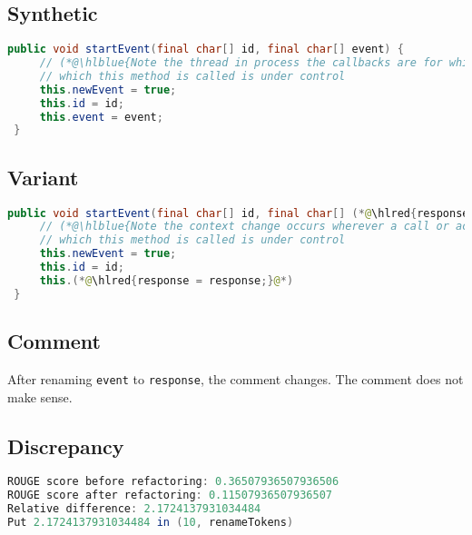 \documentclass[11pt]{article}
\DeclareRobustCommand{\hlred}[1]{{\sethlcolor{YellowOrange}\hl{#1}}}
\DeclareRobustCommand{\hlblue}[1]{{\sethlcolor{SeaGreen}\hl{#1}}}
\DeclareRobustCommand{\hlblue}[1]{{\sethlcolor{SkyBlue}\hl{#1}}}
\begin{document}
\subsection{Synthetic}

\begin{lstlisting}[language=java]
 public void startEvent(final char[] id, final char[] event) {
     // (*@\hlblue{Note the thread in process the callbacks are for which event listeners and thus that it identifies a}@*)
     // which this method is called is under control
     this.newEvent = true;
     this.id = id;
     this.event = event;
 }
\end{lstlisting}

\subsection{Variant}

\begin{lstlisting}[language=java]
 public void startEvent(final char[] id, final char[] (*@\hlred{response}@*)) {
     // (*@\hlblue{Note the context change occurs wherever a call or action from this instance which originated within a transaction instance}@*)
     // which this method is called is under control
     this.newEvent = true;
     this.id = id;
     this.(*@\hlred{response = response;}@*)
 }
\end{lstlisting}

\subsection{Comment}

After renaming \texttt{event} to \texttt{response}, the comment changes. The comment does not make sense.

\subsection{Discrepancy}

\begin{lstlisting}[language=java]
ROUGE score before refactoring: 0.36507936507936506
ROUGE score after refactoring: 0.11507936507936507
Relative difference: 2.1724137931034484
Put 2.1724137931034484 in (10, renameTokens)
\end{lstlisting}




\end{document}

